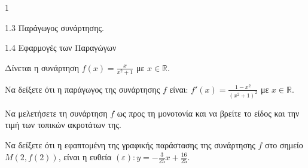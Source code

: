 \begin{ylh}{1}
    \item 1.3 Παράγωγος συνάρτησης.
    \item 1.4 Εφαρμογές των Παραγώγων
\end{ylh}
Δίνεται η συνάρτηση $f(x) = \frac{x}{x^2 + 1}$ με $x \in \mathbb{R}$.
\begin{alist}
    \item Να δείξετε ότι η παράγωγος της συνάρτησης $f$ είναι: $f'(x) = \frac{1 - x^2}{(x^2 + 1)^2}$ με $x \in \mathbb{R}$.

    \item Να μελετήσετε τη συνάρτηση $f$ ως προς τη μονοτονία και να βρείτε το είδος και την τιμή των τοπικών ακροτάτων της.

    \item Να δείξετε ότι η εφαπτομένη της γραφικής παράστασης της συνάρτησης $f$ στο σημείο $M(2, f(2))$, είναι η ευθεία $(\varepsilon): y = -\frac{3}{25}x + \frac{16}{25}$.
\end{alist}

